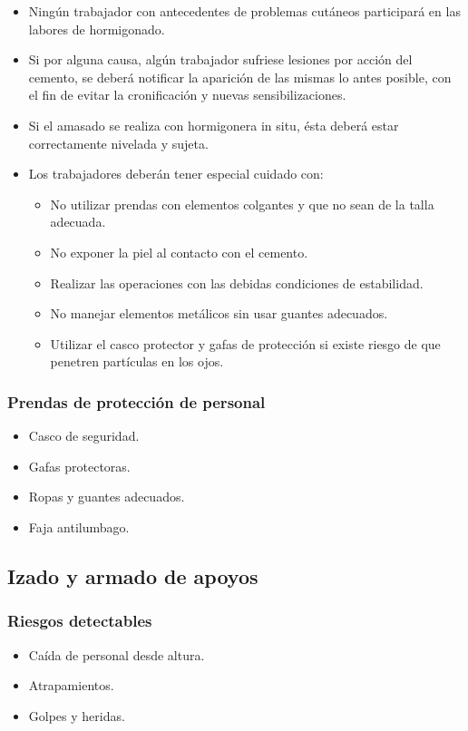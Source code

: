 \begin{itemize}
    \item Ningún trabajador con antecedentes de problemas cutáneos participará en las labores de hormigonado.
    \item Si por alguna causa, algún trabajador sufriese lesiones por acción del cemento, se deberá notificar la aparición de las mismas lo antes posible, con el fin de evitar la cronificación y nuevas sensibilizaciones.
    \item Si el amasado se realiza con hormigonera in situ, ésta deberá estar correctamente nivelada y sujeta.
    \item Los trabajadores deberán tener especial cuidado con:
    \begin{itemize}
        \item No utilizar prendas con elementos colgantes y que no sean de la talla adecuada.
        \item No exponer la piel al contacto con el cemento.
        \item Realizar las operaciones con las debidas condiciones de estabilidad.
        \item No manejar elementos metálicos sin usar guantes adecuados.
        \item Utilizar el casco protector y gafas de protección si existe riesgo de que penetren partículas en los ojos.
    \end{itemize}
\end{itemize}
\subsubsection{Prendas de protección de personal}
\label{subsubsec:sysCimentacion-EPI}
\begin{itemize}
    \item Casco de seguridad.
    \item Gafas protectoras.
    \item Ropas y guantes adecuados.
    \item Faja antilumbago.
\end{itemize}
\subsection{Izado y armado de apoyos}
\label{subsec:sys-riesgosApoyos}
\subsubsection{Riesgos detectables}
\label{subsubsec:sysApoyos-RD}
\begin{itemize}
    \item Caída de personal desde altura.
    \item Atrapamientos.
    \item Golpes y heridas.
\end{itemize}

